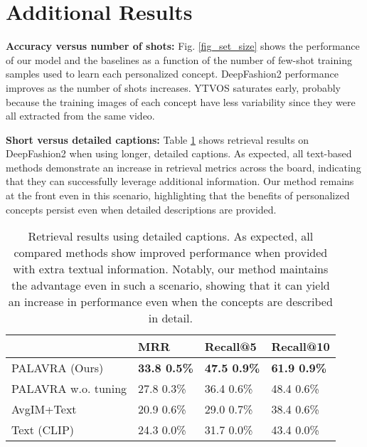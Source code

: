 \documentclass[runningheads]{llncs}
\newcommand{\figref}[1]{Fig. \ref{#1}}
\begin{document}
\section{Additional Results}
\label{sec_additional_results}
\vspace{15pt}\noindent\textbf{Accuracy versus number of shots:}
\figref{fig_set_size} shows the performance of our model and the baselines as a function of the number of few-shot training samples used to learn each personalized concept. DeepFashion2 performance improves as the number of shots increases. YTVOS saturates early, probably because the training images of each concept have less variability since they were all extracted from the same video.

\vspace{15pt}\noindent\textbf{Short versus detailed captions:}
Table \ref{tab:long_captions} shows retrieval results on DeepFashion2 when using longer, detailed captions. As expected, all text-based methods demonstrate an increase in retrieval metrics across the board, indicating that they can successfully leverage additional information. Our method remains at the front even in this scenario, highlighting that the benefits of personalized concepts persist even when detailed descriptions are provided.

\setlength{\tabcolsep}{4pt}
\begin{table}[htbp]
\centering
    \begin{tabular}{llll}
    \toprule
    {} &               MRR &          Recall@5 &         Recall@10 \\
    \midrule
    PALAVRA (Ours)      &  \textbf{33.8  0.5\% } &  \textbf{47.5  0.9\% } &  \textbf{61.9  0.9\%  } \\
    PALAVRA w.o. tuning &  27.8  0.3\% &  36.4  0.6\% &  48.4  0.6\% \\
    AvgIM+Text          &  20.9  0.6\% &  29.0  0.7\% &  38.4  0.6\% \\
    Text (CLIP)         &  24.3  0.0\% &  31.7  0.0\% &  43.4  0.0\% \\
    \bottomrule
    \end{tabular}
    \vspace{2pt}
    \caption{Retrieval results using detailed captions. As expected, all compared methods show improved performance when provided with extra textual information. Notably, our method maintains the advantage even in such a scenario, showing that it can yield an increase in performance even when the concepts are described in detail.}
    \label{tab:long_captions}
\end{table}
\end{document}
